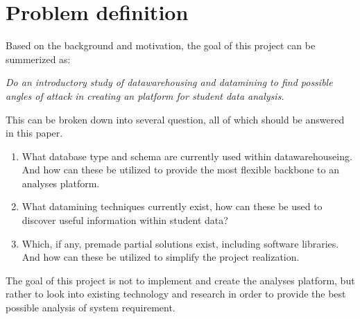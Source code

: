 \section{Problem definition}
	Based on the background and motivation, the goal of this project can be summerized as: 
	
	
	\textit{Do an introductory study of datawarehousing and datamining to find possible angles of attack in
	creating an platform for student data analysis. }\newline
	
	This can be broken down into several question, all of which should be answered in this paper.
	
	\begin{enumerate}
		\item What database type and schema are currently used within datawarehouseing. 
			And how can these be utilized to provide the most flexible backbone to an analyses platform.
		\item What datamining techniques currently exist, how can these be used to discover useful information
		within student data?
		\item Which, if any, premade partial solutions exist, including software libraries. 
		And how can these be utilized to simplify the project realization.
	\end{enumerate}
		
	The goal of this project is not to implement and create the analyses platform, 
	but rather to look into existing technology and research in order to provide the best
	possible analysis of system requirement.